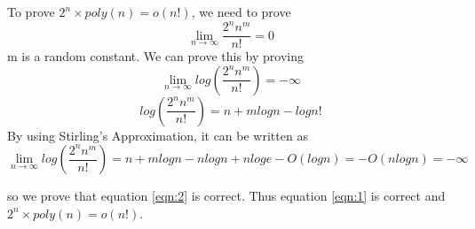 \begin{solution}
    To prove $2^n \times poly(n)=o(n!)$, we need to prove
    \begin{equation}
        \label{eqn:1}
        \lim_{n \to \infty} \frac{2^nn^m}{n!} = 0
    \end{equation}
    m is a random constant. We can prove this by proving
    \begin{equation}
        \label{eqn:2}
        \lim_{n \to \infty} log(\frac{2^nn^m}{n!}) = -\infty
    \end{equation}
    $$log(\frac{2^nn^m}{n!}) = n + mlogn - logn!$$
    By using Stirling's Approximation, it can be written as
    $$\lim_{n \to \infty} log(\frac{2^nn^m}{n!}) = n + mlogn - nlogn + nloge - O(logn) = -O(nlogn) = -\infty$$
    
    so we prove that equation \ref{eqn:2} is correct. Thus equation \ref{eqn:1} is correct and $2^n \times poly(n)=o(n!)$.

\end{solution}
